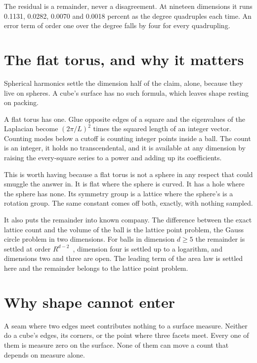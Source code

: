 The residual is a remainder, never a disagreement. At nineteen dimensions it runs 0.1131, 0.0282, 0.0070 and 0.0018 percent as the degree quadruples each time. An error term of order one over the degree falls by four for every quadrupling.

\section{The flat torus, and why it matters}

Spherical harmonics settle the dimension half of the claim, alone, because they live on spheres. A cube's surface has no such formula, which leaves shape resting on packing.

A flat torus has one. Glue opposite edges of a square and the eigenvalues of the Laplacian become $(2\pi/L)^2$ times the squared length of an integer vector. Counting modes below a cutoff is counting integer points inside a ball. The count is an integer, it holds no transcendental, and it is available at any dimension by raising the every-square series to a power and adding up its coefficients.

This is worth having because a flat torus is not a sphere in any respect that could smuggle the answer in. It is flat where the sphere is curved. It has a hole where the sphere has none. Its symmetry group is a lattice where the sphere's is a rotation group. The same constant comes off both, exactly, with nothing sampled.

It also puts the remainder into known company. The difference between the exact lattice count and the volume of the ball is the lattice point problem, the Gauss circle problem in two dimensions. For balls in dimension $d \ge 5$ the remainder is settled at order $R^{d-2}$~\cite{src:Walfisz-1957}, dimension four is settled up to a logarithm, and dimensions two and three are open. The leading term of the area law is settled here and the remainder belongs to the lattice point problem.

\section{Why shape cannot enter}

A seam where two edges meet contributes nothing to a surface measure. Neither do a cube's edges, its corners, or the point where three facets meet. Every one of them is measure zero on the surface. None of them can move a count that depends on measure alone.

